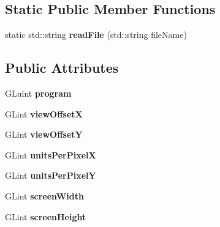 \subsection*{Static Public Member Functions}
\begin{DoxyCompactItemize}
\item 
static std\+::string {\bfseries read\+File} (std\+::string file\+Name)\hypertarget{classShaderProgram_ab0705c01246e6a70e8c3bc278666b2d0}{}\label{classShaderProgram_ab0705c01246e6a70e8c3bc278666b2d0}

\end{DoxyCompactItemize}
\subsection*{Public Attributes}
\begin{DoxyCompactItemize}
\item 
G\+Luint {\bfseries program}\hypertarget{classShaderProgram_a5cd33e7bf1c9d23b2eef8aa93dc36558}{}\label{classShaderProgram_a5cd33e7bf1c9d23b2eef8aa93dc36558}

\item 
G\+Lint {\bfseries view\+OffsetX}\hypertarget{classShaderProgram_ad9000af8292a5de7a33108ae6c775acd}{}\label{classShaderProgram_ad9000af8292a5de7a33108ae6c775acd}

\item 
G\+Lint {\bfseries view\+OffsetY}\hypertarget{classShaderProgram_a5f68b35bbd45e69c2b53310cc5f6d73f}{}\label{classShaderProgram_a5f68b35bbd45e69c2b53310cc5f6d73f}

\item 
G\+Lint {\bfseries units\+Per\+PixelX}\hypertarget{classShaderProgram_ab228e6feb1db07d20255c6bde5ed33a8}{}\label{classShaderProgram_ab228e6feb1db07d20255c6bde5ed33a8}

\item 
G\+Lint {\bfseries units\+Per\+PixelY}\hypertarget{classShaderProgram_addaecff211bcb14fe9f254c31f407327}{}\label{classShaderProgram_addaecff211bcb14fe9f254c31f407327}

\item 
G\+Lint {\bfseries screen\+Width}\hypertarget{classShaderProgram_ac9dc87f9ae304100c66a86f59c6ddc63}{}\label{classShaderProgram_ac9dc87f9ae304100c66a86f59c6ddc63}

\item 
G\+Lint {\bfseries screen\+Height}\hypertarget{classShaderProgram_adf3cf91290d9ccdc9a07a88dffaf8bcb}{}\label{classShaderProgram_adf3cf91290d9ccdc9a07a88dffaf8bcb}

\end{DoxyCompactItemize}


